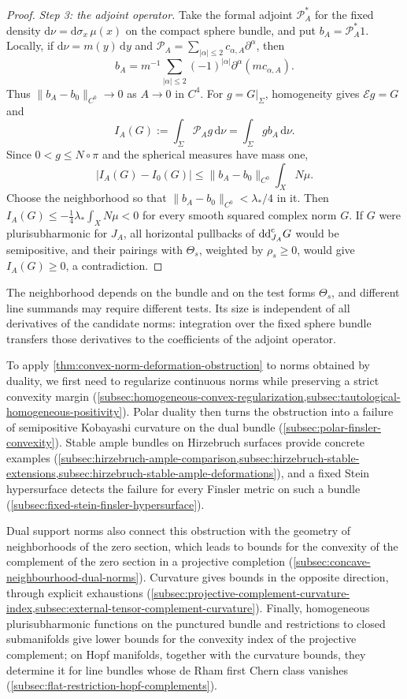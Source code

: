 \begin{proof}
\emph{Step 3: the adjoint operator.} Take the formal adjoint $\mathcal P_A^*$ for the fixed density
$\mathrm d\nu=\mathrm d\sigma_x\,\mu(x)$ on the compact sphere bundle, and put $b_A=\mathcal P_A^*1$. Locally, if
$\mathrm d\nu=m(y)\,\mathrm dy$ and
$\mathcal P_A=\sum_{|\alpha|\leq2}c_{\alpha,A}\partial^\alpha$, then
\[
 b_A=m^{-1}\sum_{|\alpha|\leq2}(-1)^{|\alpha|}
                 \partial^\alpha(mc_{\alpha,A}).
\]
Thus $\|b_A-b_0\|_{C^0}\to0$ as $A\to0$ in $C^4$.
For $g=G|_\Sigma$, homogeneity gives $\mathcal Eg=G$ and
\[
 I_A(G):=\int_\Sigma\mathcal P_Ag\,\mathrm d\nu
        =\int_\Sigma gb_A\,\mathrm d\nu.
\]
Since $0<g\leq N\circ\pi$ and the spherical measures have mass one,
\[
 |I_A(G)-I_0(G)|
 \leq\|b_A-b_0\|_{C^0}\int_XN\mu.
\]
Choose the neighborhood so that $\|b_A-b_0\|_{C^0}<\lambda_*/4$ in it. Then
$I_A(G)\leq-\frac14\lambda_*\int_XN\mu<0$ for every smooth squared complex norm $G$. If $G$ were plurisubharmonic for $J_A$, all horizontal pullbacks of $\mathrm{dd}^{\mathrm{c}}_{J_A}G$ would be semipositive, and their pairings with $\Theta_s$, weighted by $\rho_s\geq0$, would give $I_A(G)\geq0$, a contradiction.
\end{proof}

The neighborhood depends on the bundle and on the test forms $\Theta_s$, and different line summands may require different tests. Its size is independent of all derivatives of the candidate norms: integration over the fixed sphere bundle transfers those derivatives to the coefficients of the adjoint operator.

To apply \cref{thm:convex-norm-deformation-obstruction} to norms obtained by duality, we first need to regularize continuous norms while preserving a strict convexity margin (\cref{subsec:homogeneous-convex-regularization,subsec:tautological-homogeneous-positivity}). Polar duality then turns the obstruction into a failure of semipositive Kobayashi curvature on the dual bundle (\cref{subsec:polar-finsler-convexity}). Stable ample bundles on Hirzebruch surfaces provide concrete examples (\cref{subsec:hirzebruch-ample-comparison,subsec:hirzebruch-stable-extensions,subsec:hirzebruch-stable-ample-deformations}), and a fixed Stein hypersurface detects the failure for every Finsler metric on such a bundle (\cref{subsec:fixed-stein-finsler-hypersurface}).

Dual support norms also connect this obstruction with the geometry of neighborhoods of the zero section, which leads to bounds for the convexity of the complement of the zero section in a projective completion (\cref{subsec:concave-neighbourhood-dual-norms}). Curvature gives bounds in the opposite direction, through explicit exhaustions (\cref{subsec:projective-complement-curvature-index,subsec:external-tensor-complement-curvature}). Finally, homogeneous plurisubharmonic functions on the punctured bundle and restrictions to closed submanifolds give lower bounds for the convexity index of the projective complement; on Hopf manifolds, together with the curvature bounds, they determine it for line bundles whose de Rham first Chern class vanishes (\cref{subsec:flat-restriction-hopf-complements}).

